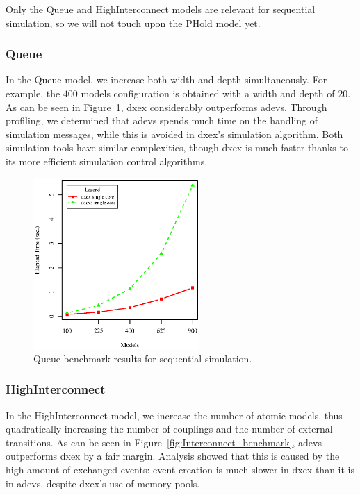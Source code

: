 Only the Queue and HighInterconnect models are relevant for sequential simulation, so we will not touch upon the PHold model yet.

\subsubsection{Queue}
In the Queue model, we increase both width and depth simultaneously.
For example, the $400$ models configuration is obtained with a width and depth of $20$.
As can be seen in Figure~\ref{fig:Queue_benchmark}, dxex considerably outperforms adevs.
Through profiling, we determined that adevs spends much time on the handling of simulation messages, while this is avoided in dxex's simulation algorithm.
Both simulation tools have similar complexities, though dxex is much faster thanks to its more efficient simulation control algorithms.

\begin{figure}
	\includegraphics[width=\columnwidth,height=6.5cm]{fig/queue_sequential.eps}
	\caption{Queue benchmark results for sequential simulation.}
	\label{fig:Queue_benchmark}
\end{figure}

\subsubsection{HighInterconnect}
In the HighInterconnect model, we increase the number of atomic models, thus quadratically increasing the number of couplings and the number of external transitions.
As can be seen in Figure~\ref{fig:Interconnect_benchmark}, adevs outperforms dxex by a fair margin.
Analysis showed that this is caused by the high amount of exchanged events: event creation is much slower in dxex than it is in adevs, despite dxex's use of memory pools.

